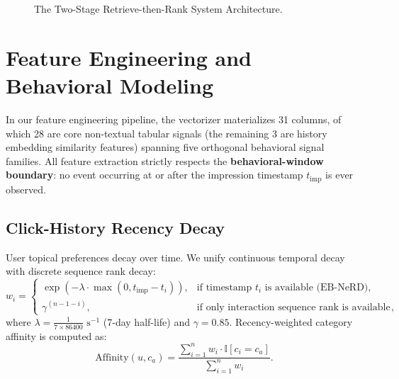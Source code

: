 \documentclass[11pt,a4paper]{article}
\begin{document}
\begin{figure}[t]
\centering
{}
\caption{The Two-Stage Retrieve-then-Rank System Architecture.}
\label{fig:architecture}
\end{figure}

\section{Feature Engineering and Behavioral Modeling}

In our feature engineering pipeline, the vectorizer materializes 31 columns, of which 28 are core non-textual tabular signals (the remaining 3 are history embedding similarity features) spanning five orthogonal behavioral signal families. All feature extraction strictly respects the \textbf{behavioral-window boundary}: no event occurring at or after the impression timestamp $t_{\text{imp}}$ is ever observed.

\subsection{Click-History Recency Decay}
User topical preferences decay over time. We unify continuous temporal decay with discrete sequence rank decay:
\begin{equation}
w_i = \begin{cases}
\exp(-\lambda \cdot \max(0, t_{\text{imp}} - t_i)), & \text{if timestamp } t_i \text{ is available (EB-NeRD)}, \\
\gamma^{(n - 1 - i)}, & \text{if only interaction sequence rank is available (MIND)},
\end{cases}
\end{equation}
where $\lambda = \frac{1}{7 \times 86400}\text{ s}^{-1}$ (7-day half-life) and $\gamma = 0.85$. Recency-weighted category affinity is computed as:
\begin{equation}
\text{Affinity}(u, c_a) = \frac{\sum_{i=1}^n w_i \cdot \mathbb{I}[c_i = c_a]}{\sum_{i=1}^n w_i}.
\end{equation}
\end{document}
